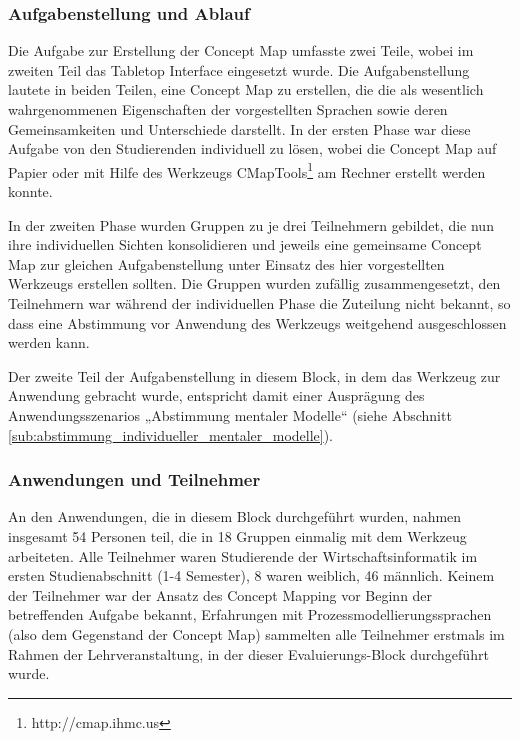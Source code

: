 
\subsubsection{Aufgabenstellung und Ablauf} %
\label{ssub:3_aufgabenstellung}

Die Aufgabe zur Erstellung der Concept Map umfasste zwei Teile, wobei im zweiten Teil das Tabletop Interface eingesetzt wurde. Die Aufgabenstellung lautete in beiden Teilen, eine Concept Map zu erstellen, die die als wesentlich wahrgenommenen Eigenschaften der vorgestellten Sprachen sowie deren Gemeinsamkeiten und Unterschiede darstellt. In der ersten Phase war diese Aufgabe von den Studierenden individuell zu lösen, wobei die Concept Map auf Papier oder mit Hilfe des Werkzeugs CMapTools\footnote{http://cmap.ihmc.us} \citep{Canas04} am Rechner erstellt werden konnte. 

In der zweiten Phase wurden Gruppen zu je drei Teilnehmern gebildet, die nun ihre individuellen Sichten konsolidieren und jeweils eine gemeinsame Concept Map zur gleichen Aufgabenstellung unter Einsatz des hier vorgestellten Werkzeugs erstellen sollten. Die Gruppen wurden zufällig zusammengesetzt, den Teilnehmern war während der individuellen Phase die Zuteilung nicht bekannt, so dass eine Abstimmung vor Anwendung des Werkzeugs weitgehend ausgeschlossen werden kann.

Der zweite Teil der Aufgabenstellung in diesem Block, in dem das Werkzeug zur Anwendung gebracht wurde, entspricht damit einer Ausprägung des Anwendungsszenarios „Abstimmung mentaler Modelle“ (siehe Abschnitt \ref{sub:abstimmung_individueller_mentaler_modelle}).


\subsubsection{Anwendungen und Teilnehmer} %
\label{ssub:3_teilnehmer}

An den Anwendungen, die in diesem Block durchgeführt wurden, nahmen insgesamt 54 Personen teil, die in 18 Gruppen einmalig mit dem Werkzeug arbeiteten. Alle Teilnehmer waren Studierende der Wirtschaftsinformatik im ersten Studienabschnitt (1-4 Semester), 8 waren weiblich, 46 männlich. Keinem der Teilnehmer war der Ansatz des Concept Mapping vor Beginn der betreffenden Aufgabe bekannt, Erfahrungen mit Prozessmodellierungssprachen (also dem Gegenstand der Concept Map) sammelten alle Teilnehmer erstmals im Rahmen der Lehrveranstaltung, in der dieser Evaluierungs-Block durchgeführt wurde.

